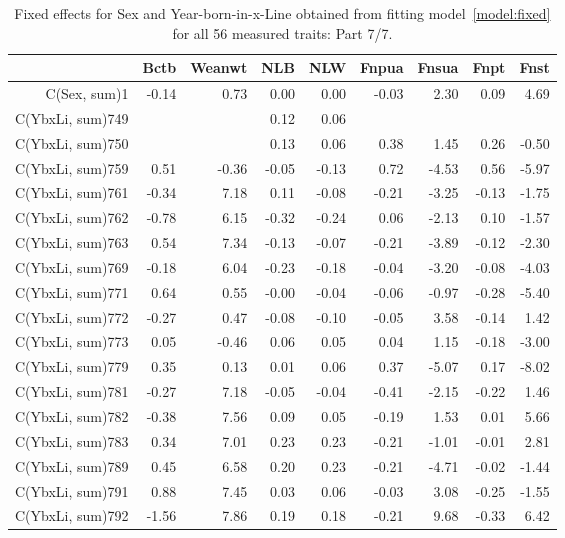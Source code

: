 \begin{table}[p]
\centering
\caption{Fixed effects for Sex and Year-born-in-x-Line obtained from fitting model~\ref{model:fixed} for all 56 measured traits: Part 7/7.}
\label{tab:b7}
\begin{tabular}{rrrrrrrrr}
  \hline
 & Bctb & Weanwt & NLB & NLW & Fnpua & Fnsua & Fnpt & Fnst \\ 
  \hline
C(Sex, sum)1 & -0.14 & 0.73 & 0.00 & 0.00 & -0.03 & 2.30 & 0.09 & 4.69 \\ 
  C(YbxLi, sum)749 &  &  & 0.12 & 0.06 &  &  &  &  \\ 
  C(YbxLi, sum)750 &  &  & 0.13 & 0.06 & 0.38 & 1.45 & 0.26 & -0.50 \\ 
  C(YbxLi, sum)759 & 0.51 & -0.36 & -0.05 & -0.13 & 0.72 & -4.53 & 0.56 & -5.97 \\ 
  C(YbxLi, sum)761 & -0.34 & 7.18 & 0.11 & -0.08 & -0.21 & -3.25 & -0.13 & -1.75 \\ 
  C(YbxLi, sum)762 & -0.78 & 6.15 & -0.32 & -0.24 & 0.06 & -2.13 & 0.10 & -1.57 \\ 
  C(YbxLi, sum)763 & 0.54 & 7.34 & -0.13 & -0.07 & -0.21 & -3.89 & -0.12 & -2.30 \\ 
  C(YbxLi, sum)769 & -0.18 & 6.04 & -0.23 & -0.18 & -0.04 & -3.20 & -0.08 & -4.03 \\ 
  C(YbxLi, sum)771 & 0.64 & 0.55 & -0.00 & -0.04 & -0.06 & -0.97 & -0.28 & -5.40 \\ 
  C(YbxLi, sum)772 & -0.27 & 0.47 & -0.08 & -0.10 & -0.05 & 3.58 & -0.14 & 1.42 \\ 
  C(YbxLi, sum)773 & 0.05 & -0.46 & 0.06 & 0.05 & 0.04 & 1.15 & -0.18 & -3.00 \\ 
  C(YbxLi, sum)779 & 0.35 & 0.13 & 0.01 & 0.06 & 0.37 & -5.07 & 0.17 & -8.02 \\ 
  C(YbxLi, sum)781 & -0.27 & 7.18 & -0.05 & -0.04 & -0.41 & -2.15 & -0.22 & 1.46 \\ 
  C(YbxLi, sum)782 & -0.38 & 7.56 & 0.09 & 0.05 & -0.19 & 1.53 & 0.01 & 5.66 \\ 
  C(YbxLi, sum)783 & 0.34 & 7.01 & 0.23 & 0.23 & -0.21 & -1.01 & -0.01 & 2.81 \\ 
  C(YbxLi, sum)789 & 0.45 & 6.58 & 0.20 & 0.23 & -0.21 & -4.71 & -0.02 & -1.44 \\ 
  C(YbxLi, sum)791 & 0.88 & 7.45 & 0.03 & 0.06 & -0.03 & 3.08 & -0.25 & -1.55 \\ 
  C(YbxLi, sum)792 & -1.56 & 7.86 & 0.19 & 0.18 & -0.21 & 9.68 & -0.33 & 6.42 \\ 

\end{tabular}
\end{table}
